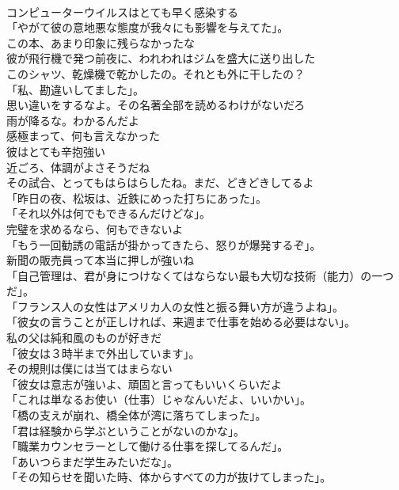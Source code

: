 \documentclass[8pt]{extreport}
\begin{document}
\begin{CJK}{UTF8}{min}
\\	コンピューターウイルスはとても早く感染する	
\\	「やがて彼の意地悪な態度が我々にも影響を与えてた」。	
\\	この本、あまり印象に残らなかったな	
\\	彼が飛行機で発つ前夜に、われわれはジムを盛大に送り出した	
\\	このシャツ、乾燥機で乾かしたの。それとも外に干したの？	
\\	「私、勘違いしてました」。	
\\	思い違いをするなよ。その名著全部を読めるわけがないだろ	
\\	雨が降るな。わかるんだよ	
\\	感極まって、何も言えなかった	
\\	彼はとても辛抱強い	
\\	近ごろ、体調がよさそうだね	
\\	その試合、とってもはらはらしたね。まだ、どきどきしてるよ	
\\	「昨日の夜、松坂は、近鉄にめった打ちにあった」。	
\\	「それ以外は何でもできるんだけどな」。	
\\	完璧を求めるなら、何もできないよ	
\\	「もう一回勧誘の電話が掛かってきたら、怒りが爆発するぞ」。	
\\	新聞の販売員って本当に押しが強いね	
\\	「自己管理は、君が身につけなくてはならない最も大切な技術（能力）の一つだ」。	
\\	「フランス人の女性はアメリカ人の女性と振る舞い方が違うよね」。	
\\	「彼女の言うことが正しければ、来週まで仕事を始める必要はない」。	
\\	私の父は純和風のものが好きだ	
\\	「彼女は３時半まで外出しています」。	
\\	その規則は僕には当てはまらない	
\\	「彼女は意志が強いよ、頑固と言ってもいいくらいだよ	
\\	「これは単なるお使い（仕事）じゃなんいだよ、いいかい」。	
\\	「橋の支えが崩れ、橋全体が湾に落ちてしまった」。	
\\	「君は経験から学ぶということがないのかな」。	
\\	「職業カウンセラーとして働ける仕事を探してるんだ」。	
\\	「あいつらまだ学生みたいだな」。	
\\	「その知らせを聞いた時、体からすべての力が抜けてしまった」。	

\end{CJK}
\end{document}
